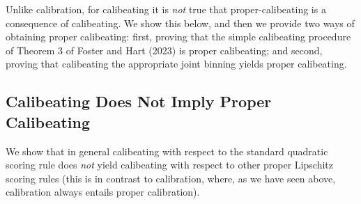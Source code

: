 \documentclass[12pt,a4paper,notitlepage]{article}
\begin{document}
Unlike calibration, for calibeating it is \emph{not} true that
proper-calibeating is a consequence of calibeating. We show this below, and
then we provide two ways of obtaining proper calibeating: first, proving
that the simple calibeating procedure of Theorem 3 of Foster and Hart (2023)
is proper calibeating; and second, proving that calibeating the appropriate
joint binning yields proper calibeating.

\subsection{Calibeating Does Not Imply Proper Calibeating\label{sus:example}}

We show that in general calibeating with respect to the standard quadratic
scoring rule does \emph{not} yield calibeating with respect to other proper
Lipschitz scoring rules (this is in contrast to calibration, where, as we
have seen above, calibration always entails proper calibration).
\end{document}
